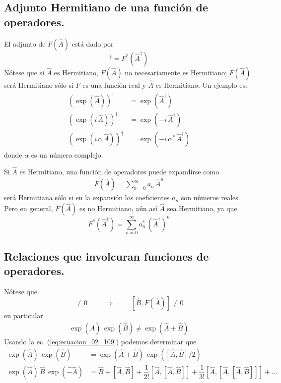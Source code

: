 \subsection*{Adjunto Hermitiano de una función de operadores.}
El adjunto de $F(\hat{A})$ está dado por
\begin{equation}
[F(\hat{A})]^{\dagger} = F^{*}(\hat{A}^{\dagger})
\label{eq:ecuacion_02_112}
\end{equation}
Nótese que si $\hat{A}$ es Hermitiano, $F(\hat{A})$ no necesariamente es Hermitiano; $F(\hat{A})$ será Hermitiano sólo si $F$ es una función real y $\hat{A}$ es Hermitiano. Un ejemplo es:
\begin{align}
\begin{aligned}
\left( \exp(\hat{A}) \right)^{\dagger} &= \exp(\hat{A}^{\dagger}) \\[1em]
\left( \exp(i \, \hat{A}) \right)^{\dagger} &= \exp(-i \, \hat{A}^{\dagger}) \\[1em]
\left( \exp(i \, \alpha \, \hat{A}) \right)^{\dagger} &= \exp(-i \, \alpha^{*} \, \hat{A}^{\dagger})
\end{aligned}
\label{eq:ecuacion_02_113}
\end{align}
donde $\alpha$ es un número complejo.
\par
Si $\hat{A}$ es Hermitiano, una función de operadores puede expandirse como
\begin{align*}
F(\hat{A}) = \sum_{n=0}^{\infty} a_{n} \, \hat{A}^{n}
\end{align*}
será Hermitiana sólo si en la expansión los coeficientes $a_{n}$ son números reales. Pero en general, $F(\hat{A})$ es no Hermitiano, aún así $\hat{A}$ sea Hermitiano, ya que
\begin{equation}
F^{*}(\hat{A}^{\dagger}) = \sum_{n=0}^{\infty} a_{n}^{*} \, (\hat{A}^{\dagger})^{n}
\label{eq:ecuacion_02_114}
\end{equation}
\subsection*{Relaciones que involcuran funciones de operadores.}
Nótese que
\begin{equation}
[\hat{A}, \hat{B}] \neq 0 \hspace{1cm} \Longrightarrow \hspace{1cm} [\hat{B} , F(\hat{A}) ] \neq 0
\label{eq:ecuacion_02_115}
\end{equation}
en particular
\begin{align*}
\exp(\hat{A}) \, \exp(\hat{B}) \neq \exp(\hat{A} + \hat{B})
\end{align*}
Usando la ec. (\ref{eq:ecuacion_02_109}) podemos determinar que
\begin{align}
\exp(\hat{A}) \, \exp(\hat{B}) &= \exp(\hat{A} + \hat{B}) \, \exp([\hat{A}, \hat{B}]/2) \label{eq:ecuacion_02_116} \\[1em]
\exp(\hat{A}) \, \hat{B} \, \exp(\hat{-A}) &= \hat{B} + [\hat{A}, \hat{B}] + \dfrac{1}{2!} [\hat{A}, [\hat{A}, \hat{B}]] + \dfrac{1}{3!} [\hat{A}, [ \hat{A}, [\hat{A}, \hat{B}]]] + \ldots \label{eq:ecuacion_02_117}
\end{align}

